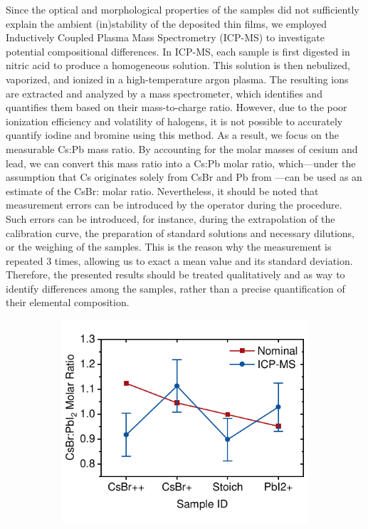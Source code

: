 Since the optical and morphological properties of the samples did not sufficiently explain the ambient (in)stability of the deposited thin films, we employed Inductively Coupled Plasma Mass Spectrometry (ICP-MS) to investigate potential compositional differences. In ICP-MS, each sample is first digested in nitric acid to produce a homogeneous solution. This solution is then nebulized, vaporized, and ionized in a high-temperature argon plasma. The resulting ions are extracted and analyzed by a mass spectrometer, which identifies and quantifies them based on their mass-to-charge ratio. However, due to the poor ionization efficiency and volatility of halogens, it is not possible to accurately quantify iodine and bromine using this method. As a result, we focus on the measurable Cs:Pb mass ratio. By accounting for the molar masses of cesium and lead, we can convert this mass ratio into a Cs:Pb molar ratio, which—under the assumption that Cs originates solely from CsBr and Pb from —can be used as an estimate of the CsBr: molar ratio. Nevertheless, it should be noted that measurement errors can be introduced by the operator during the procedure. Such errors can be introduced, for instance, during the extrapolation of the calibration curve, the preparation of standard solutions and necessary dilutions, or the weighing of the samples. This is the reason why the measurement is repeated 3 times, allowing us to exact a mean value and its standard deviation. Therefore, the presented results should be treated qualitatively and as way to identify differences among the samples, rather than a precise quantification of their elemental composition. 

\begin{figure}[htbp]
    \centering
    \begin{subfigure}[t]{0.65\textwidth}
        \centering
        \includegraphics[width=\textwidth]{chapters/stability/imeges/Stability-ICP-MS.pdf} %
    \end{subfigure}

    \caption{}
    \label{fig:stability:icp_ms}
\end{figure}

